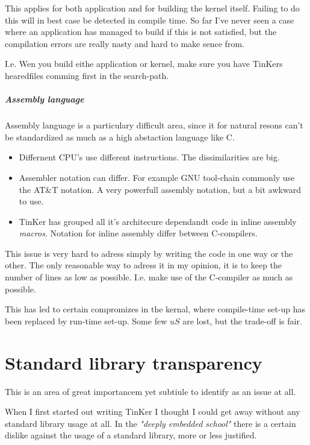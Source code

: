 This applies for both application and for building the kernel itself. Failing to do this will in best case be detected in compile time. So far I've never seen a case where an application has managed to build if this is not satisfied, but the compilation errors are really nasty and hard to make sence from.

I.e. Wen you build eithe application or kernel, make sure you have TinKers hearedfiles comming first in the search-path.

\paragraph{Assembly language}
Assembly language is a particulary difficult area, since it for natural resons can't be standardized as much as a high abstaction language like C.

\begin{itemize}
	\item Differnent CPU's use different instructions. The dissimilarities are big.
	\item Assembler notation can differ. For example GNU tool-chain commonly use the AT\&T notation. A very powerfull assembly notation, but a bit awkward to use.
	\item TinKer has grouped all it's architecure dependandt code in inline assembly \textit{macros}. Notation for inline assembly differ between C-compilers.
\end{itemize}
This issue is very hard to adress simply by writing the code in one way or the other. The only reasonable way to adress it in my opinion, it is to keep the number of lines as low as possible. I.e. make use of the C-compiler as much as possible.

This has led to certain compromizes in the kernal, where compile-time set-up has been replaced by run-time set-up. Some few $uS$ are lost, but the trade-off is fair.


\chapter{Standard library transparency}
This is an area of great importancem yet subtiule to identify as an issue at all.

When I first started out writing TinKer I thought I could get away without any standard library usage at all. In the \textit{"deeply embedded school"} there is a certain dislike against the usage of a standard library, more or less justified.

